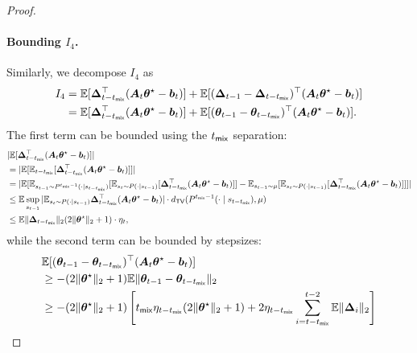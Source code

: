 \begin{proof}
\paragraph{Bounding $I_4$.} Similarly, we decompose $I_4$ as
\begin{align*}
I_4 &=  \mathbb{E}[\bm{\Delta}_{t-t_{\mathsf{mix}}}^\top (\bm{A}_t \bm{\theta}^\star - \bm{b}_t)] + \mathbb{E}[(\bm{\Delta}_{t-1} - \bm{\Delta}_{t-t_{\mathsf{mix}}})^\top (\bm{A}_t \bm{\theta}^\star - \bm{b}_t)]\\ 
&= \mathbb{E}[\bm{\Delta}_{t-t_{\mathsf{mix}}}^\top (\bm{A}_t \bm{\theta}^\star - \bm{b}_t)] + \mathbb{E}[(\bm{\theta}_{t-1} - \bm{\theta}_{t-t_{\mathsf{mix}}})^\top (\bm{A}_t \bm{\theta}^\star - \bm{b}_t)].
\end{align*}
The first term can be bounded using  the $t_{\mathsf{mix}}$ separation: %
\begin{align*}
&|\mathbb{E}[\bm{\Delta}_{t-t_{\mathsf{mix}}}^\top (\bm{A}_t \bm{\theta}^\star - \bm{b}_t)]| \\ 
&= |\mathbb{E} [\mathbb{E}_{t-t_{\mathsf{mix}}}[\bm{\Delta}_{t-t_{\mathsf{mix}}}^\top (\bm{A}_t \bm{\theta}^\star - \bm{b}_t)]]|\\ 
&= |\mathbb{E} [\mathbb{E}_{s_{t-1} \sim P^{t_{\mathsf{mix}}-1}(\cdot \mid s_{t-t_{\mathsf{mix}}})}[\mathbb{E}_{s_t \sim P(\cdot \mid s_{t-1})}[\bm{\Delta}_{t-t_{\mathsf{mix}}}^\top(\bm{A}_t \bm{\theta}^\star - \bm{b}_t)]] -  \mathbb{E}_{s_{t-1}\sim \mu }[\mathbb{E}_{s_t \sim P(\cdot \mid s_{t-1}) }[\bm{\Delta}_{t-t_{\mathsf{mix}}}^\top (\bm{A}_t \bm{\theta}^\star - \bm{b}_t)]]]|\\
&\leq \mathbb{E} \sup_{s_{t-1}} |\mathbb{E}_{s_t \sim P(\cdot \mid s_{t-1})}\bm{\Delta}_{t-t_{\mathsf{mix}}}^\top(\bm{A}_t \bm{\theta}^\star - \bm{b}_t)| \cdot d_{\mathsf{TV}}(P^{t_{\mathsf{mix}}-1}(\cdot \mid s_{t-t_{\mathsf{mix}}}),\mu)\\
&\leq  \mathbb{E}\|\bm{\Delta}_{t-t_{\mathsf{mix}}}\|_2 (2\|\bm{\theta}^\star\|_2 + 1) \cdot \eta_t,
\end{align*}
while the second term can be bounded by stepsizes:
\begin{align*}
&\mathbb{E}[(\bm{\theta}_{t-1} - \bm{\theta}_{t-t_{\mix}})^\top (\bm{A}_t \bm{\theta}^\star - \bm{b}_t)]\\ 
&\geq -(2\|\bm{\theta}^\star\|_2 + 1)\mathbb{E}\|\bm{\theta}_{t-1} - \bm{\theta}_{t-t_{\mix}}\|_2 \\ 
&\geq -(2\|\bm{\theta}^\star\|_2 + 1) \left[t_{\mix} \eta_{t-t_{\mix}} (2\|\bm{\theta}^\star\|_2 + 1) + 2\eta_{t-t_{\mix}} \sum_{i=t-t_{\mix}}^{t-2} \mathbb{E}\|\bm{\Delta}_i\|_2\right]\\ 

\end{align*}
\end{proof}
